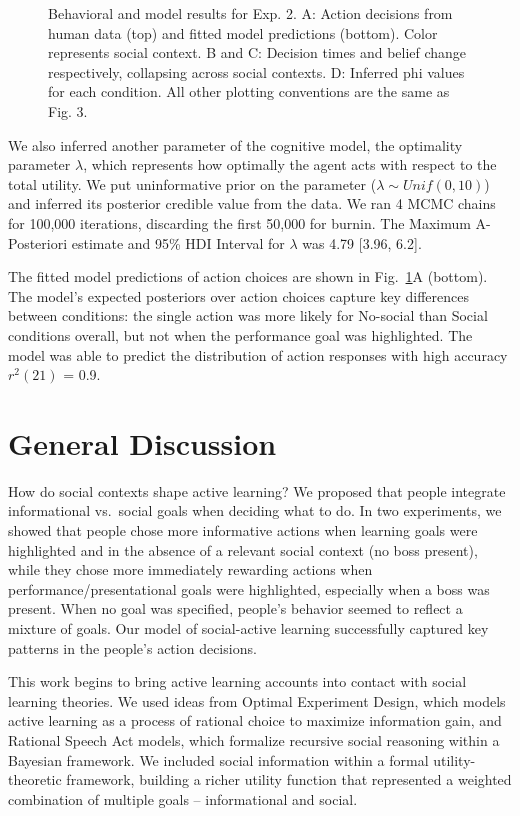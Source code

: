 \documentclass[10pt, letterpaper]{article}
\newenvironment{CodeChunk}{}{}
\begin{document}
\begin{CodeChunk}
\begin{figure}[H]
{}

\caption[Behavioral and model results for Exp]{Behavioral and model results for Exp. 2. A: Action decisions from human data (top) and fitted model predictions (bottom). Color represents social context. B and C: Decision times and belief change respectively, collapsing across social contexts. D: Inferred phi values for each condition. All other plotting conventions are the same as Fig. 3.}\label{fig:e2_results}
\end{figure}
\end{CodeChunk}

We also inferred another parameter of the cognitive model, the
optimality parameter \(\lambda\), which represents how optimally the
agent acts with respect to the total utility. We put uninformative prior
on the parameter (\(\lambda \sim Unif(0,10)\)) and inferred its
posterior credible value from the data. We ran 4 MCMC chains for 100,000
iterations, discarding the first 50,000 for burnin. The Maximum A-
Posteriori estimate and 95\% HDI Interval for \(\lambda\) was 4.79
{[}3.96, 6.2{]}.

The fitted model predictions of action choices are shown in
Fig.~\ref{fig:e2_results}A (bottom). The model's expected posteriors
over action choices capture key differences between conditions: the
single action was more likely for No-social than Social conditions
overall, but not when the performance goal was highlighted. The model
was able to predict the distribution of action responses with high
accuracy \(r^2(21)\) = 0.9.

\section{General Discussion}\label{general-discussion}

How do social contexts shape active learning? We proposed that people
integrate informational vs.~social goals when deciding what to do. In
two experiments, we showed that people chose more informative actions
when learning goals were highlighted and in the absence of a relevant
social context (no boss present), while they chose more immediately
rewarding actions when performance/presentational goals were
highlighted, especially when a boss was present. When no goal was
specified, people's behavior seemed to reflect a mixture of goals. Our
model of social-active learning successfully captured key patterns in
the people's action decisions.

This work begins to bring active learning accounts into contact with
social learning theories. We used ideas from Optimal Experiment Design,
which models active learning as a process of rational choice to maximize
information gain, and Rational Speech Act models, which formalize
recursive social reasoning within a Bayesian framework. We included
social information within a formal utility-theoretic framework, building
a richer utility function that represented a weighted combination of
multiple goals -- informational and social.
\end{document}
